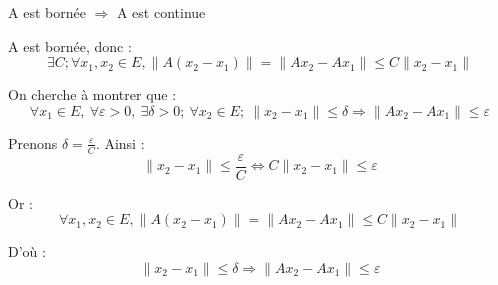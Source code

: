 \documentclass{article}
\begin{document}
A est bornée $\Rightarrow$ A est continue

A est bornée, donc : \[\exists C; \forall x_1, x_2 \in E, \|A(x_2-x_1)\| = \|Ax_2 -Ax_1\| \leq C\|x_2 - x_1\|\]

On cherche à montrer que :
\[\forall x_1\in E,\ \forall \varepsilon >0,\ \exists \delta>0;\ \forall x_2\in E;\ \|x_2-x_1\|\leq \delta \Rightarrow \|Ax_2 - Ax_1\| \leq \varepsilon \]

Prenons $\delta=\frac{\varepsilon}{C}$. Ainsi :
\[\|x_2-x_1\|\leq \frac{\varepsilon}{C} \Leftrightarrow C\|x_2-x_1\|\leq \varepsilon\]

Or :
\[\forall x_1, x_2 \in E, \|A(x_2-x_1)\| = \|Ax_2 -Ax_1\| \leq C\|x_2 - x_1\|\]

D'où :
\[\|x_2-x_1\|\leq \delta \Rightarrow \|Ax_2 - Ax_1\| \leq \varepsilon\]
\end{document}
